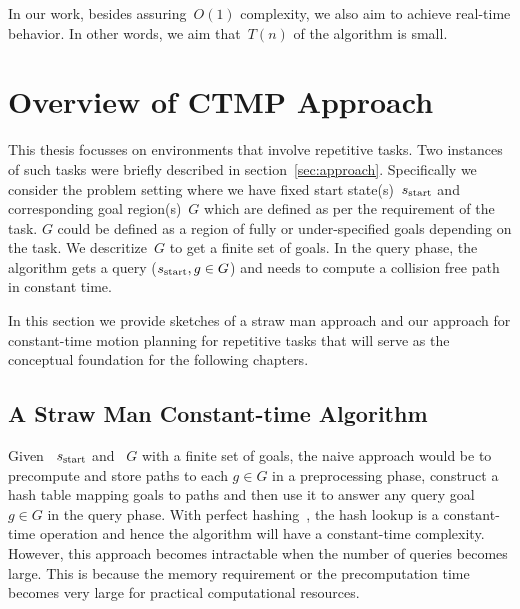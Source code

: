 \documentclass[a4paper]{report}
\begin{document}
In our work, besides assuring~$O(1)$ complexity, we also aim to achieve real-time behavior. In other words, we aim that~$T(n)$ of the algorithm is small.

\section{Overview of CTMP Approach}
This thesis focusses on environments that involve repetitive tasks. Two instances of such tasks were briefly described in section~\ref{sec:approach}. Specifically we consider the problem setting where we have fixed start state(s)~$s_{\textrm{start}}$ and corresponding goal region(s)~$G$ which are defined as per the requirement of the task. $G$ could be defined as a region of fully or under-specified goals depending on the task. We descritize~$G$ to get a finite set of goals. In the query phase, the algorithm gets a query ($s_{\text{start}}, g \in G$) and needs to compute a collision free path in constant time.


In this section we provide sketches of a straw man approach and our approach for constant-time motion planning for repetitive tasks that will serve as the conceptual foundation for the following chapters.

\subsection{A Straw Man Constant-time Algorithm}
Given ~$s_{\text{start}}$ and ~$G$ with a finite set of goals, the naive approach would be to precompute and store paths to each $g \in G$ in a preprocessing phase, construct a hash table mapping goals to paths and then use it to answer any query goal~$g \in G$ in the query phase.
With perfect hashing~\cite{czech1997perfect}, the hash lookup is a constant-time operation and hence the algorithm will have a constant-time complexity. However, this approach becomes intractable when the number of queries becomes large. This is because the memory requirement or the precomputation time becomes very large for practical computational resources.
\end{document}
